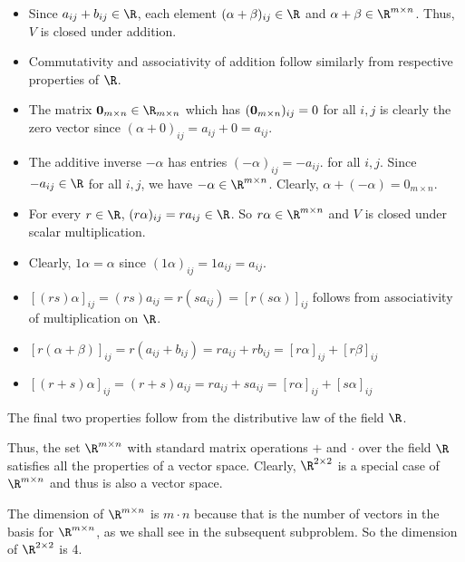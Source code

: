 \documentclass{homework}
\begin{document}
\begin{letterenum}
        \begin{itemize}
            \item Since $a_{ij} + b_{ij} \in \R$, each element
                $(\alpha + \beta)_{ij} \in \R$ and
                $\alpha + \beta \in \R^{m \times n}$. Thus, $V$ is closed under addition.
            \item Commutativity and associativity of addition follow similarly
                from respective properties of $\R$.
            \item The matrix ${\bf 0}_{m \times n} \in \R_{m \times n}$ which
                has $({\bf 0}_{m \times n})_{ij} = 0$ for all $i,j$ is clearly
                the zero vector since $(\alpha + 0)_{ij} = a_{ij} + 0 = a_{ij}$.
            \item The additive inverse $-\alpha$ has entries $(-\alpha)_{ij} = -a_{ij}$.
                for all $i,j$. Since $-a_{ij} \in \R$ for all $i,j$, we have
                    $-\alpha \in \R^{m \times n}$. Clearly, $\alpha + (-\alpha) = 0_{m \times n}$.
            \item For every $r \in \R$, $(r\alpha)_{ij} = r a_{ij} \in \R$.
                So $r\alpha \in \R^{m \times n}$ and $V$ is closed under scalar
                multiplication.
            \item Clearly, $1 \alpha = \alpha$ since $(1\alpha)_{ij} = 1 a_{ij} = a_{ij}$.
            \item $[(rs)\alpha]_{ij} = (rs)a_{ij} = r(s a_{ij}) = [r (s \alpha)]_{ij}$
                follows from associativity of multiplication on $\R$.
            \item $[r (\alpha + \beta)]_{ij} = r(a_{ij} + b_{ij}) = r a_{ij} + r b_{ij} = [r \alpha]_{ij} + [r \beta]_{ij}$
            \item $[(r+s) \alpha]_{ij} = (r+s)a_{ij} = r a_{ij} + s a_{ij} = [r \alpha]_{ij} + [s \alpha]_{ij}$
        \end{itemize}
        The final two properties follow from the distributive law of the field $\R$.

        Thus, the set $\R^{m \times n}$ with standard matrix operations $+$
        and $\cdot$ over the field $\R$ satisfies all the properties of a 
        vector space. Clearly, $\R^{2 \times 2}$ is a special case of
        $\R^{m \times n}$ and thus is also a vector space.

    \item The dimension of $\R^{m \times n}$ is $m \cdot n$ because that is
        the number of vectors in the basis for $\R^{m \times n}$, as we shall
        see in the subsequent subproblem. So the dimension of 
        $\R^{2 \times 2}$ is 4.


\end{letterenum}
\end{document}

